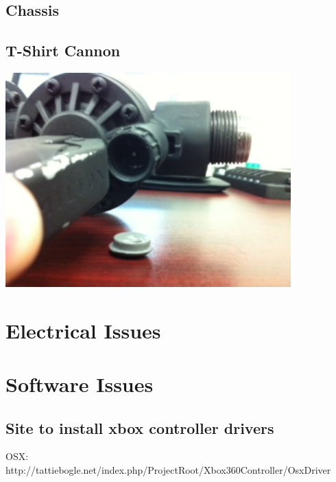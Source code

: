 \documentclass[letterpaper,12pt]{report}
\begin{document}
\subsection{Chassis}
\subsection{T-Shirt Cannon}

\begin{center}
    \includegraphics[width=11cm]{pics/cannon/broken_release_valve.jpg}
\end{center}

\section{Electrical Issues}

\section{Software Issues}
\subsection{Site to install xbox controller drivers}
OSX: http://tattiebogle.net/index.php/ProjectRoot/Xbox360Controller/OsxDriver
\end{document}
